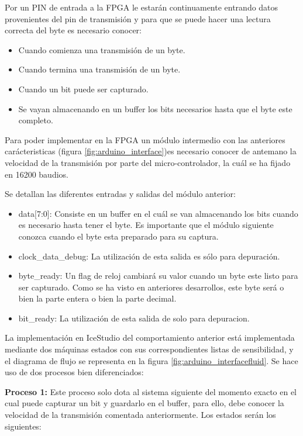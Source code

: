 Por un PIN de entrada a la FPGA le estarán continuamente entrando datos provenientes del pin de transmisión y para que se puede hacer una lectura correcta del byte es necesario conocer: 

\begin{itemize}
	\item Cuando comienza una transmisión de un byte.
	\item Cuando termina una transmisión de un byte.
	\item Cuando un bit puede ser capturado. 
	\item Se vayan almacenando en un buffer los bits necesarios hasta que el byte este completo.
\end{itemize}

Para poder implementar en la FPGA un módulo intermedio con las anteriores carácteristicas  (figura \ref{fig:arduino_interface})es necesario conocer de antemano la velocidad de la transmisión por parte del micro-controlador, la cuál se ha fijado en 16200 baudios. \newline

Se detallan las diferentes entradas y salidas del módulo anterior: 

\begin{itemize}
	\item data[7:0]: Consiste en un buffer en el cuál se van almacenando los bits cuando es necesario hasta tener el byte. Es importante que el módulo siguiente conozca cuando el byte esta preparado para su captura.
	\item clock\_data\_debug: La utilización de esta salida es sólo para depuración.
	\item byte\_ready: Un flag de reloj cambiará su valor cuando un byte este listo para ser capturado. Como se ha visto en anteriores desarrollos, este byte será o bien la parte entera o bien la parte decimal.
	\item bit\_ready: La utilización de esta salida de solo para depuracion.
\end{itemize} 

La implementación en IceStudio del comportamiento anterior está implementada mediante dos máquinas estados con sus correspondientes listas de sensibilidad, y el diagrama de flujo se representa en la figura \ref{fig:arduino_interfacefluid}. Se hace uso de dos procesos bien diferenciados:

\textbf{Proceso 1:} Este proceso solo dota al sistema siguiente del momento exacto en el cual puede capturar un bit y guardarlo en el buffer, para ello, debe conocer la velocidad de la transmisión comentada anteriormente. Los estados serán los siguientes: 

